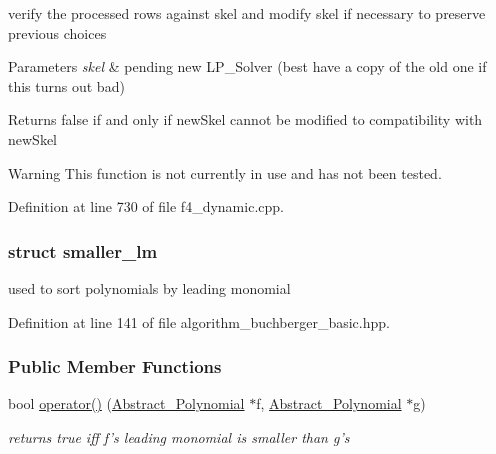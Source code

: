 verify the processed rows against {\ttfamily skel} and modify {\ttfamily skel} if necessary to preserve previous choices 


\begin{DoxyParams}{Parameters}
{\em skel} & pending new {\ttfamily L\+P\+\_\+\+Solver} (best have a copy of the old one if this turns out bad) \\
\hline
\end{DoxyParams}
\begin{DoxyReturn}{Returns}
{\ttfamily false} if and only if {\ttfamily new\+Skel} cannot be modified to compatibility with {\ttfamily new\+Skel} 
\end{DoxyReturn}
\begin{DoxyWarning}{Warning}
This function is not currently in use and has not been tested. 
\end{DoxyWarning}


Definition at line 730 of file f4\+\_\+dynamic.\+cpp.

\label{structsmaller__lm}
\subsubsection{struct smaller\+\_\+lm}
used to sort polynomials by leading monomial 

Definition at line 141 of file algorithm\+\_\+buchberger\+\_\+basic.\+hpp.

\subsubsection*{Public Member Functions}
\begin{DoxyCompactItemize}
\item 
bool \hyperlink{group___g_b_computation_a683ffd0302d029cd21c5bafdf4335785}{operator()} (\hyperlink{group__polygroup_class_abstract___polynomial}{Abstract\+\_\+\+Polynomial} $\ast$f, \hyperlink{group__polygroup_class_abstract___polynomial}{Abstract\+\_\+\+Polynomial} $\ast$g)
\begin{DoxyCompactList}\small\item\em returns {\ttfamily true} iff {\ttfamily f's} leading monomial is smaller than {\ttfamily g's} \end{DoxyCompactList}\end{DoxyCompactItemize}


